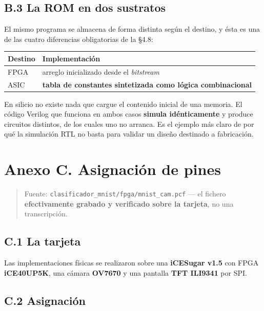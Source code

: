 \subsection{B.3 La ROM en dos
sustratos}\label{b.3-la-rom-en-dos-sustratos}

El mismo programa se almacena de forma distinta según el destino, y ésta
es una de las cuatro diferencias obligatorias de la §4.8:

\begin{longtable}[]{@{}ll@{}}
\toprule\noalign{}
Destino & Implementación \\
\midrule\noalign{}
\endhead
\bottomrule\noalign{}
\endlastfoot
FPGA & arreglo inicializado desde el \emph{bitstream} \\
ASIC & \textbf{tabla de constantes sintetizada como lógica
combinacional} \\
\end{longtable}

En silicio no existe nada que cargue el contenido inicial de una
memoria. El código Verilog que funciona en ambos casos \textbf{simula
idénticamente} y produce circuitos distintos, de los cuales uno no
arranca. Es el ejemplo más claro de por qué la simulación RTL no basta
para validar un diseño destinado a fabricación.

\section{Anexo C. Asignación de
pines}\label{anexo-c.-asignaciuxf3n-de-pines}

\begin{quote}
Fuente: \texttt{clasificador\_mnist/fpga/mnist\_cam.pcf} --- el fichero
\textbf{efectivamente grabado y verificado sobre la tarjeta}, no una
transcripción.
\end{quote}

\subsection{C.1 La tarjeta}\label{c.1-la-tarjeta}

Las implementaciones físicas se realizaron sobre una \textbf{iCESugar
v1.5} con FPGA \textbf{iCE40UP5K}, una cámara \textbf{OV7670} y una
pantalla \textbf{TFT ILI9341} por SPI.

\subsection{C.2 Asignación}\label{c.2-asignaciuxf3n}

